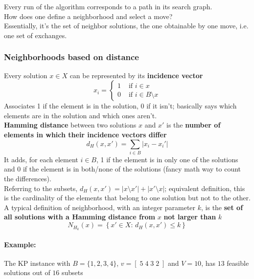 \documentclass[11pt]{article}
\begin{document}
	Every run of the algorithm corresponds to a path in its search graph.\\
	
	How does one define a neighborhood and select a move? \\
	
	Essentially, it's the set of neighbor solutions, the one obtainable by one move, i.e. one set of exchanges.\\
	
	\newpage
	
	\subsubsection{Neighborhoods based on distance}
	
	Every solution $x \in X$ can be represented by its \textbf{incidence vector}
	$$ x_i = \begin{cases}
		1 & \text{ if } i \in x \\
		0 & \text{ if } i \in B \setminus x
	\end{cases}$$
	Associates 1 if the element is in the solution, 0 if it isn't; basically says which elements are in the solution and which ones aren't.\\
	
	\textbf{Hamming distance} between two solutions $x$ and $x'$  is the \textbf{number of elements in which their incidence vectors differ}
	$$ d_H (x, x') = \sum_{i \in B} |x_i - x_i'|$$
	It adds, for each element $i \in B$, 1 if the element is in only one of the solutions and 0 if the element is in both/none of the solutions (fancy math way to count the differences).\\
	
	Referring to the subsets, $d_H (x, x') = |x \setminus x'| + |x' \setminus x|$; equivalent definition, this is the cardinality of the elements that belong to one solution but not to the other.\\
	
	A typical definition of neighborhood, with an integer parameter $k$, is the \textbf{set of all solutions with a Hamming distance from} $x$ \textbf{not larger than} $k$
	$$ N_{H_k} (x) = \left\{x' \in X: \, d_H (x, x') \leq k \right\} $$
	
	\newpage
	
	\paragraph{Example:} The KP instance with $B = \{1, 2, 3, 4\}$, $v = [ \; 5 \; 4 \; 3 \; 2 \; ]$ and $V = 10$, has $13$ feasible solutions out of $16$ subsets
	
\end{document}
